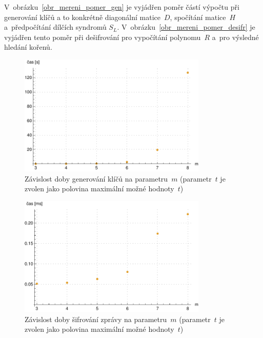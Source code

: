 \documentclass[thesis=M,czech,hidelinks]{FITthesis}[2012/06/26]
\newcommand{\0}{{\textcolor[gray]{0.75}{0}}}
\begin{document}
V~obrázku~\ref{obr_mereni_pomer_gen} je vyjádřen poměr částí výpočtu při
generování klíčů a to konkrétně diagonální matice~$D$, spočítání matice~$H$
a~předpočítání dílčích syndromů $S_L$. V~obrázku~\ref{obr_mereni_pomer_desifr}
je vyjádřen tento poměr při dešifrování pro vypočítání polynomu~$R$ a~pro
výsledné hledání kořenů.

\vfil

\begin{figure}[!ht]
    \centering
    \includegraphics[width=0.8\textwidth]{../implementace/grafy/listplot_tPul_generovani.pdf}
    \caption[Časová složitost generování klíčů]{
        Závislost doby generování klíčů na parametru~$m$
        (parametr~$t$ je zvolen jako polovina maximální možné hodnoty~$t$)
    }
    \label{obr_mereni_m_gen}
\end{figure}

\begin{figure}[!ht]
    \centering
    \includegraphics[width=0.8\textwidth]{../implementace/grafy/listplot_tPul_sifrovani.pdf}
    \caption[Časová složitost šifrování]{
        Závislost doby šifrování zprávy na parametru~$m$
        (parametr~$t$ je zvolen jako polovina maximální možné hodnoty~$t$)
    }
    \label{obr_mereni_m_sifr}
\end{figure}
\end{document}
